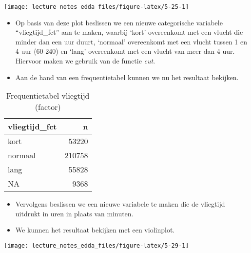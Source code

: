 \documentclass[]{memoir}
\newenvironment{Shaded}{\begin{snugshade}}{\end{snugshade}}
\newcommand{\DataTypeTok}[1]{\textcolor[rgb]{0.13,0.29,0.53}{#1}}
\newcommand{\DecValTok}[1]{\textcolor[rgb]{0.00,0.00,0.81}{#1}}
\newcommand{\KeywordTok}[1]{\textcolor[rgb]{0.13,0.29,0.53}{\textbf{#1}}}
\newcommand{\NormalTok}[1]{#1}
\newcommand{\OperatorTok}[1]{\textcolor[rgb]{0.81,0.36,0.00}{\textbf{#1}}}
\newcommand{\StringTok}[1]{\textcolor[rgb]{0.31,0.60,0.02}{#1}}
\providecommand{\tightlist}{%
  \setlength{\itemsep}{0pt}\setlength{\parskip}{0pt}}
\begin{document}
\texttt{[image: lecture\_notes\_edda\_files/figure-latex/5-25-1]}

\begin{itemize}
\item
  Op basis van deze plot beslissen we een nieuwe categorische variabele ``vliegtijd\_fct'' aan te maken, waarbij `kort' overeenkomt met een vlucht die minder dan een uur duurt, `normaal' overeenkomt met een vlucht tussen 1 en 4 uur (60-240) en `lang' overeenkomt met een vlucht van meer dan 4 uur. Hiervoor maken we gebruik van de functie \emph{cut}.
\item
  Aan de hand van een frequentietabel kunnen we nu het resultaat bekijken.
\end{itemize}

\begin{table}[t]

\caption{\label{tab:5-27b}Frequentietabel vliegtijd (factor)}
\centering
\fontsize{10}{12}\selectfont
\begin{tabular}{lr}
\toprule
vliegtijd\_fct & n\\
\midrule
kort & 53220\\
normaal & 210758\\
lang & 55828\\
NA & 9368\\
\bottomrule
\end{tabular}
\end{table}

\begin{itemize}
\tightlist
\item
  Vervolgens beslissen we een nieuwe variabele te maken die de vliegtijd uitdrukt in uren in plaats van minuten.
\end{itemize}

\begin{Shaded}
\end{Shaded}

\begin{itemize}
\tightlist
\item
  We kunnen het resultaat bekijken met een violinplot.
\end{itemize}

\texttt{[image: lecture\_notes\_edda\_files/figure-latex/5-29-1]}
\end{document}
